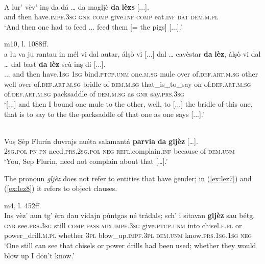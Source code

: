 \ea
\label{ex:lez4}
\\
\gll A lur' vèv’ inṣ da dá … da magljè \textbf{da} \textbf{lèzs} [...].\\
and then have.\textsc{impf.3sg} \textsc{gnr} \textsc{comp} give.\textsc{inf} {} \textsc{comp} eat.\textsc{inf} \textsc{dat} \textsc{dem.m.pl}\\
\glt `And then one had to feed ... feed them [= the pigs] [...].'
\z

\ea\label{ex:lez5}
 {m10, l. 1088ff.}\\
\gll  [...] a lu va ju rantau in mél vi dal autar,  álṣò vi [...] dal … cavèstar \textbf{da} \textbf{lèz}, álṣò vi dal … dal bast \textbf{da} \textbf{lèz} scù inṣ di [...].  \\
{...} and then have.\textsc{1sg} \textsc{1sg} bind.\textsc{ptcp.unm} one.\textsc{m.sg} mule over of.\textsc{def.art.m.sg} other well over {} of.\textsc{def.art.m.sg} {} bridle of \textsc{dem.m.sg} that\_is\_to\_say on of.\textsc{def.art.m.sg} {} of.\textsc{def.art.m.sg} packsaddle of \textsc{dem.m.sg} as \textsc{gnr}  say.\textsc{prs.3sg} \\
\glt `[...] and then I bound one mule to the other, well, to [...] the bridle of this one, that is to say to the the packsaddle of that one as one says [...].'
\z

\ea
\label{ex:lez6}
\\
\gll Vuṣ Ṣèp Flurín duvrajs nuéta salamantá \textbf{parvia} \textbf{da} \textbf{gljèz} […].\\
\textsc{2sg.pol} \textsc{pn} \textsc{pn} need.\textsc{prs.2sg.pol} \textsc{neg} \textsc{refl.}complain.\textsc{inf} because of \textsc{dem.unm} \\
\glt `You, Sep Flurin, need not complain about that […].'
\z

The pronoun \textit{gljèz} does not refer to entities that have gender; in (\ref{ex:lez7}) and (\ref{ex:lez8}) it refers to object clauses.


\ea
\label{ex:lez7}
 {m4, l. 452ff.}\\
\gll Ins vèz’ aun tg’ èra dau vidajn pùntgas né trádals; sch’ i sitavan \textbf{gljèz} sau bétg.\\
\textsc{gnr} see.\textsc{prs.3sg} still \textsc{comp} \textsc{pass.aux.impf.3sg} give.\textsc{ptcp.unm} into chisel.\textsc{f.pl} or power\_drill.\textsc{m.pl} whether \textsc{3pl} blow\_up.\textsc{impf.3pl} \textsc{dem.unm} know.\textsc{prs.1sg.1sg} \textsc{neg}\\
\glt `One still can see that chisels or power drills had been used; whether they would blow up I don’t know.'
\z

